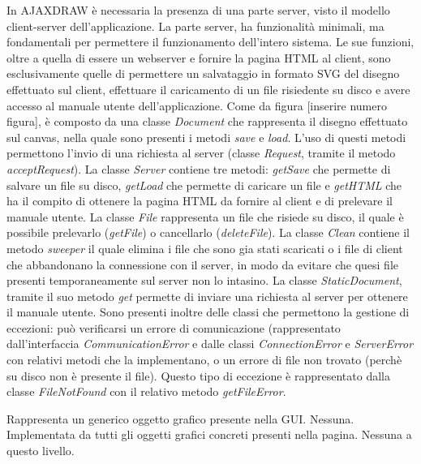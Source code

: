 In AJAXDRAW \`e necessaria la presenza di una parte server, visto il modello client-server dell'applicazione. La parte server, ha funzionalit\`a minimali, ma fondamentali per permettere il funzionamento dell'intero sistema. Le sue funzioni, oltre a quella di essere un webserver e fornire la pagina HTML al client, sono esclusivamente quelle di permettere un salvataggio in formato SVG del disegno effettuato sul client, effettuare il caricamento di un file risiedente su disco e avere accesso al manuale utente dell'applicazione. Come da figura [inserire numero figura], \`e composto da una classe \textit{Document} che rappresenta il disegno effettuato sul canvas, nella quale sono presenti i metodi \textit{save} e \textit{load}. L'uso di questi metodi permettono l'invio di una richiesta al server (classe \textit{Request}, tramite il metodo \textit{acceptRequest}). La classe \textit{Server} contiene tre metodi: \textit{getSave} che permette di salvare un file su disco, \textit{getLoad} che permette di caricare un file e \textit{getHTML} che ha il compito di ottenere la pagina HTML da fornire al client e di prelevare il manuale utente. La classe \textit{File} rappresenta un file che risiede su disco, il quale \`e possibile prelevarlo (\textit{getFile}) o cancellarlo (\textit{deleteFile}). La classe \textit{Clean} contiene il metodo \textit{sweeper} il quale elimina i file che sono gia stati scaricati o i file di client che abbandonano la connessione con il server, in modo da evitare che quesi file presenti temporaneamente sul server non lo intasino. La classe \textit{StaticDocument}, tramite il suo metodo \textit{get} permette di inviare una richiesta al server per ottenere il manuale utente. Sono presenti inoltre delle classi che permettono la gestione di eccezioni: pu\`o verificarsi un errore di comunicazione (rappresentato dall'interfaccia \textit{CommunicationError} e dalle classi \textit{ConnectionError} e \textit{ServerError} con relativi metodi che la implementano, o un errore di file non trovato (perch\`e su disco non \`e presente il file). Questo tipo di eccezione \`e rappresentato dalla classe \textit{FileNotFound} con il relativo metodo \textit{getFileError}. 


Rappresenta un generico oggetto grafico presente nella GUI.
Nessuna.
Implementata da tutti gli oggetti grafici concreti presenti nella pagina.
Nessuna a questo livello.

